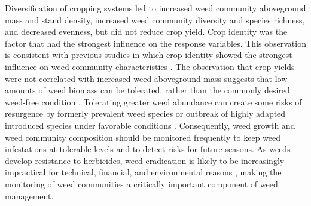 \documentclass[
]{article}
\begin{document}
Diversification of cropping systems led to increased weed community aboveground mass and stand density, increased weed community diversity and species richness, and decreased evenness, but did not reduce crop yield. Crop identity was the factor that had the strongest influence on the response variables. This observation is consistent with previous studies in which crop identity showed the strongest influence on weed community characteristics \citep{legereDiversityAssemblyWeed2005, smithAssemblyWeedCommunities2007}. The observation that crop yields were not correlated with increased weed aboveground mass suggests that low amounts of weed biomass can be tolerated, rather than the commonly desired weed-free condition \citep{zimdahlNeedHistoricalPerspective2012}. Tolerating greater weed abundance can create some risks of resurgence by formerly prevalent weed species or outbreak of highly adapted introduced species under favorable conditions \citep{mohlerWeedEvolutionCommunity2001}. Consequently, weed growth and weed community composition should be monitored frequently to keep weed infestations at tolerable levels and to detect risks for future seasons. As weeds develop resistance to herbicides, weed eradication is likely to be increasingly impractical for technical, financial, and environmental reasons \citep{brookesKeyEnvironmentalImpacts2013, stewartWeedControlEnvironmental2011}, making the monitoring of weed communities a critically important component of weed management.
\end{document}
